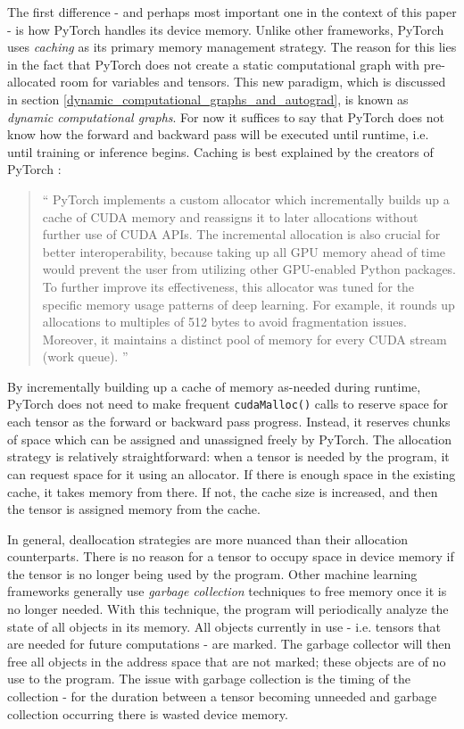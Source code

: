 \documentclass[12pt,letterpaper]{article}
\begin{document}
\label{sec:memory_caching}
The first difference - and perhaps most important one in the context of this paper - is how PyTorch handles its device memory. Unlike other frameworks, PyTorch uses \textit{caching} as its primary memory management strategy. The reason for this lies in the fact that PyTorch does not create a static computational graph with pre-allocated room for variables and tensors. This new paradigm, which is discussed in section \ref{dynamic_computational_graphs_and_autograd}, is known as \textit{dynamic computational graphs}. For now it suffices to say that PyTorch does not know how the forward and backward pass will be executed until runtime, i.e. until training or inference begins. Caching is best explained by the creators of PyTorch \cite{pytorch_paper}:

\begin{quote}
\enquote{
PyTorch implements a custom allocator which incrementally builds up a cache of CUDA memory and reassigns it to later allocations without further use of CUDA APIs. The incremental allocation is also crucial for better interoperability, because taking up all GPU memory ahead of time would prevent the user from utilizing other GPU-enabled Python packages. To further improve its effectiveness, this allocator was tuned for the specific memory usage patterns of deep learning. For example, it rounds up allocations to multiples of 512 bytes to avoid fragmentation issues. Moreover, it maintains a distinct pool of memory for every CUDA stream (work queue).
}
\end{quote}

By incrementally building up a cache of memory as-needed during runtime, PyTorch does not need to make frequent \texttt{cudaMalloc()} calls to reserve space for each tensor as the forward or backward pass progress. Instead, it reserves chunks of space which can be assigned and unassigned freely by PyTorch. The allocation strategy is relatively straightforward: when a tensor is needed by the program, it can request space for it using an allocator. If there is enough space in the existing cache, it takes memory from there. If not, the cache size is increased, and then the tensor is assigned memory from the cache.
\par 

In general, deallocation strategies are more nuanced than their allocation counterparts. There is no reason for a tensor to occupy space in device memory if the tensor is no longer being used by the program. Other machine learning frameworks generally use \textit{garbage collection} techniques to free memory once it is no longer needed. With this technique, the program will periodically analyze the state of all objects in its memory. All objects currently in use - i.e. tensors that are needed for future computations - are marked. The garbage collector will then free all objects in the address space that are not marked; these objects are of no use to the program. The issue with garbage collection is the timing of the collection - for the duration between a tensor becoming unneeded and garbage collection occurring there is wasted device memory.
\par 
\end{document}
